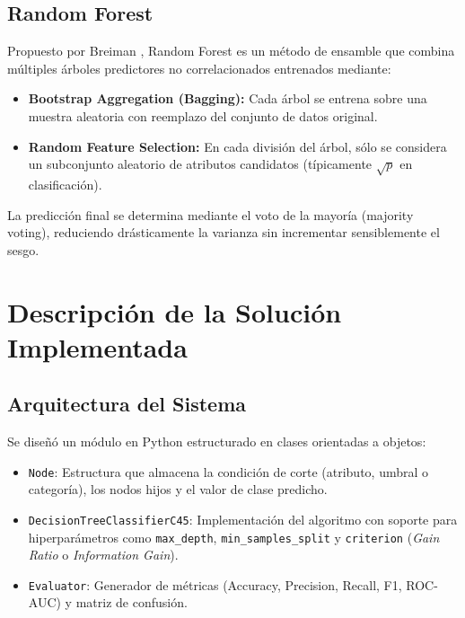 \documentclass[runningheads]{llncs}
\begin{document}
\subsection{Random Forest}
Propuesto por Breiman \cite{breiman2001random}, Random Forest es un método de ensamble que combina múltiples árboles predictores no correlacionados entrenados mediante:
\begin{itemize}
    \item \textbf{Bootstrap Aggregation (Bagging):} Cada árbol se entrena sobre una muestra aleatoria con reemplazo del conjunto de datos original.
    \item \textbf{Random Feature Selection:} En cada división del árbol, sólo se considera un subconjunto aleatorio de atributos candidatos (típicamente $\sqrt{p}$ en clasificación).
\end{itemize}
La predicción final se determina mediante el voto de la mayoría (majority voting), reduciendo drásticamente la varianza sin incrementar sensiblemente el sesgo.

\section{Descripción de la Solución Implementada}
\subsection{Arquitectura del Sistema}
Se diseñó un módulo en Python estructurado en clases orientadas a objetos:
\begin{itemize}
    \item \texttt{Node}: Estructura que almacena la condición de corte (atributo, umbral o categoría), los nodos hijos y el valor de clase predicho.
    \item \texttt{DecisionTreeClassifierC45}: Implementación del algoritmo con soporte para hiperparámetros como \texttt{max\_depth}, \texttt{min\_samples\_split} y \texttt{criterion} (\textit{Gain Ratio} o \textit{Information Gain}).
    \item \texttt{Evaluator}: Generador de métricas (Accuracy, Precision, Recall, F1, ROC-AUC) y matriz de confusión.
\end{itemize}
\end{document}
